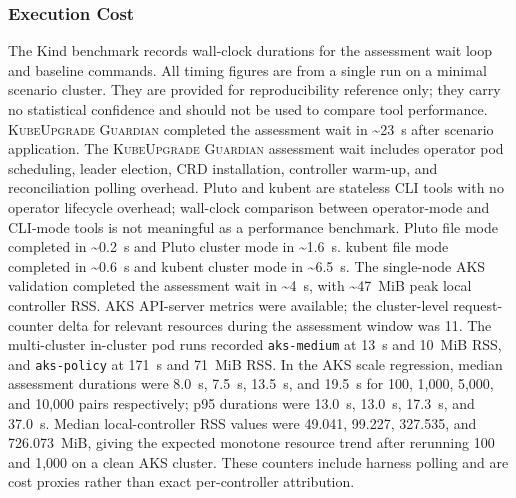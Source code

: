 \documentclass[10pt,journal]{IEEEtran}
\newcommand{\tool}{\textsc{KubeUpgrade Guardian}}
\newcommand{\code}[1]{\texttt{#1}}
\begin{document}
\subsubsection*{Execution Cost}
The Kind benchmark records wall-clock durations for the assessment wait loop and baseline commands. All timing figures are from a single run on a minimal scenario cluster. They are provided for reproducibility reference only; they carry no statistical confidence and should not be used to compare tool performance. \tool{} completed the assessment wait in \~{}23~s after scenario application. The \tool{} assessment wait includes operator pod scheduling, leader election, CRD installation, controller warm-up, and reconciliation polling overhead. Pluto and kubent are stateless CLI tools with no operator lifecycle overhead; wall-clock comparison between operator-mode and CLI-mode tools is not meaningful as a performance benchmark. Pluto file mode completed in \~{}0.2~s and Pluto cluster mode in \~{}1.6~s. kubent file mode completed in \~{}0.6~s and kubent cluster mode in \~{}6.5~s. The single-node AKS validation completed the assessment wait in \~{}4~s, with \~{}47~MiB peak local controller RSS. AKS API-server metrics were available; the cluster-level request-counter delta for relevant resources during the assessment window was 11. The multi-cluster in-cluster pod runs recorded \code{aks-medium} at 13~s and 10~MiB RSS, and \code{aks-policy} at 171~s and 71~MiB RSS. In the AKS scale regression, median assessment durations were 8.0~s, 7.5~s, 13.5~s, and 19.5~s for 100, 1,000, 5,000, and 10,000 pairs respectively; p95 durations were 13.0~s, 13.0~s, 17.3~s, and 37.0~s. Median local-controller RSS values were 49.041, 99.227, 327.535, and 726.073~MiB, giving the expected monotone resource trend after rerunning 100 and 1,000 on a clean AKS cluster. These counters include harness polling and are cost proxies rather than exact per-controller attribution.
\end{document}
